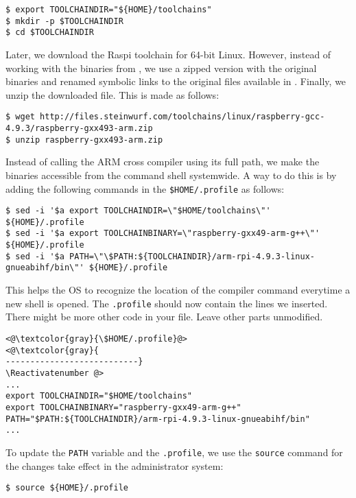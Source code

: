 \begin{lstlisting}[]
$ export TOOLCHAINDIR="${HOME}/toolchains"
$ mkdir -p $TOOLCHAINDIR
$ cd $TOOLCHAINDIR
\end{lstlisting}
\FloatBarrier
\vspace{-5mm}

Later, we download the \ac{Raspi} toolchain for 64-bit Linux. However,
instead of working with the binaries from \cite{2016rpitoolchain},
we use a zipped version with the original binaries and renamed symbolic
links to the original files available in
\cite{2016steinwurfrpitoolchain}. Finally, we unzip the downloaded file.
This is made as follows:

\begin{lstlisting}[]
$ wget http://files.steinwurf.com/toolchains/linux/raspberry-gcc-4.9.3/raspberry-gxx493-arm.zip
$ unzip raspberry-gxx493-arm.zip
\end{lstlisting}
\FloatBarrier
\vspace{-5mm}

Instead of calling the ARM cross compiler using its full path, we make
the binaries accessible from the command shell systemwide. A way to do
this is by adding the following commands in the \texttt{\${HOME}/.profile}
as follows:

\begin{lstlisting}[]
$ sed -i '$a export TOOLCHAINDIR=\"$HOME/toolchains\"' ${HOME}/.profile
$ sed -i '$a export TOOLCHAINBINARY=\"raspberry-gxx49-arm-g++\"' ${HOME}/.profile
$ sed -i '$a PATH=\"\$PATH:${TOOLCHAINDIR}/arm-rpi-4.9.3-linux-gnueabihf/bin\"' ${HOME}/.profile
\end{lstlisting}
\FloatBarrier
\vspace{-5mm}

This helps the \ac{OS} to recognize the location of the compiler
command everytime a new shell is opened. The \texttt{.profile} should now
contain the lines we inserted. There might be more other
code in your file. Leave other parts unmodified.
\Suppressnumber\begin{lstlisting}[]
<@\textcolor{gray}{\$HOME/.profile}@>
<@\textcolor{gray}{
---------------------------}
\Reactivatenumber @>
...
export TOOLCHAINDIR="$HOME/toolchains"
export TOOLCHAINBINARY="raspberry-gxx49-arm-g++"
PATH="$PATH:${TOOLCHAINDIR}/arm-rpi-4.9.3-linux-gnueabihf/bin"
...
\end{lstlisting}
\FloatBarrier
\vspace{-5mm}

To update the \texttt{PATH} variable and the \texttt{.profile}, we use the
\texttt{source} command for the changes take effect in the administrator
system:
\begin{lstlisting}[]
$ source ${HOME}/.profile
\end{lstlisting}
\FloatBarrier
\vspace{-5mm}

